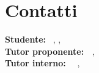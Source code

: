 \section*{Contatti}
\textbf{Studente:} \nomeStudente\ \cognomeStudente, \href{mailto:\emailStudente}{\emailStudente}, \telStudente \\
\textbf{Tutor proponente:}\titoloTutorAziendale\ \nomeTutorAziendale\ \cognomeTutorAziendale, \href{mailto:\emailTutorAziendale}{\emailTutorAziendale} \telTutorAziendale \\
\textbf{Tutor interno:} \titoloTutorInterno\ \nomeTutorInterno\ \cognomeTutorInterno, \href{mailto:\emailTutorInterno}{\emailTutorInterno}